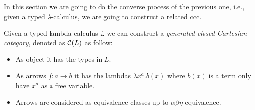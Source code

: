 In this section we are going to do the converse process of the previous one, i.e., given a typed $\lambda$-calculus, we are going to construct a related ccc.

\begin{definition}
  Given a typed lambda calculus $L$ we can construct a \emph{generated closed Cartesian category}, denoted as $\mathcal{C} (L)$ as follow:
  \begin{itemize}
  \item As object it has the types in $L$.
  \item As arrows $f:a\to b$ it has the lambdas $\lambda x^a. b(x)$ where $b(x)$ is a term only have $x^a$ as a free variable.
  \item Arrows are considered as equivalence classes up to $\alpha\beta\eta$-equivalence.
  \end{itemize}
\end{definition}

